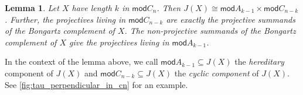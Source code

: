 \documentclass[11pt]{amsart}
\newcommand{\mods}{\mathsf{mod}}
\newtheorem{lemma}[theorem]{Lemma}
\theoremstyle{definition}
\begin{document}
\begin{lemma}\cite[Prop. 6.4, Prop. 6.5]{Msapato2022}\label{lem:projectives_in_jasso_reduction_c_n}
    Let $X$ have length $k$ in $\mods C_n$. Then $J(X) \cong \mods A_{k-1} \times \mods C_{n-k}$. Further, the projectives living in $\mods C_{n-k}$ are exactly the projective summands of the Bongartz complement of $X$. The non-projective summands of the Bongartz complement of $X$ give the projectives living in $\mods A_{k-1}$.
\end{lemma}

In the context of the lemma above, we call $\mods A_{k-1} \subseteq J(X)$ the \textit{hereditary} component of $J(X)$ and $\mods C_{n-k} \subseteq J(X)$ the \textit{cyclic component} of $J(X)$. See \cref{fig:tau_perpendicular_in_cn} for an example.

\usetikzlibrary{calc,trees}
\newcommand{\convexpath}[2]{
[   
    create hullnodes/.code={
        \global\edef\namelist{#1}
        \foreach [count=\counter] \nodename in \namelist {
            \global\edef\numberofnodes{\counter}
            \node at (\nodename) [draw=none,name=hullnode\counter] {};
        }
        \node at (hullnode\numberofnodes) [name=hullnode0,draw=none] {};
        \pgfmathtruncatemacro\lastnumber{\numberofnodes+1}
        \node at (hullnode1) [name=hullnode\lastnumber,draw=none] {};
    },
    create hullnodes
]
($(hullnode1)!#2!-90:(hullnode0)$)
\foreach [
    evaluate=\currentnode as \previousnode using \currentnode-1,
    evaluate=\currentnode as \nextnode using \currentnode+1
    ] \currentnode in {1,...,\numberofnodes} {
-- ($(hullnode\currentnode)!#2!-90:(hullnode\previousnode)$)
  let \p1 = ($(hullnode\currentnode)!#2!-90:(hullnode\previousnode) - (hullnode\currentnode)$),
    \n1 = {atan2(\y1,\x1)},
    \p2 = ($(hullnode\currentnode)!#2!90:(hullnode\nextnode) - (hullnode\currentnode)$),
    \n2 = {atan2(\y2,\x2)},
    \n{delta} = {-Mod(\n1-\n2,360)}
  in 
    {arc [start angle=\n1, delta angle=\n{delta}, radius=#2]}
}
-- cycle
}
\end{document}
